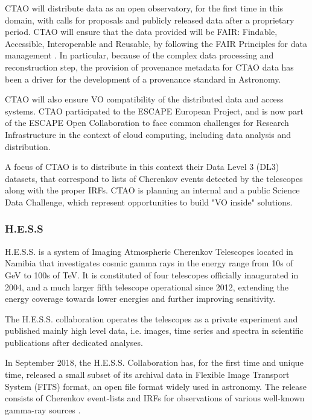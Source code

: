 \documentclass[11pt,a4paper]{ivoa}
\begin{document}
CTAO will distribute data as an open observatory, for the first time in this domain, with calls for proposals and publicly released data after a proprietary period. CTAO will ensure that the data provided will be FAIR: Findable, Accessible, Interoperable and Reusable, by following the FAIR Principles for data management \citep{Wilkinson2016}. In particular, because of the complex data processing and reconstruction step, the provision of provenance metadata for CTAO data has been a driver for the development of a provenance standard in Astronomy.

CTAO will also ensure VO compatibility of the distributed data and access systems. CTAO participated to the ESCAPE European Project, and is now part of the ESCAPE Open Collaboration to face common challenges for Research Infrastructure in the context of cloud computing, including data analysis and distribution.

A focus of CTAO is to distribute in this context their Data Level 3 (DL3) datasets, that correspond to lists of Cherenkov events detected by the telescopes along with the proper IRFs. CTAO is planning an internal and a public Science Data Challenge, which represent opportunities to build "VO inside" solutions.

\subsubsection{H.E.S.S}
\label{sec:hess}

H.E.S.S. is a system of Imaging Atmospheric Cherenkov Telescopes located in Namibia that investigates cosmic gamma rays in the energy range from 10s of GeV to 100s of TeV. It is constituted of four telescopes officially inaugurated in 2004, and a much larger fifth telescope operational since 2012, extending the energy coverage towards lower energies and further improving sensitivity.

The H.E.S.S. collaboration operates the telescopes as a private experiment and published mainly high level data, i.e. images, time series and spectra in scientific publications after dedicated analyses.

In September 2018, the H.E.S.S. Collaboration has, for the first time and unique time, released a small subset of its archival data in Flexible Image Transport System (FITS) format, an open file format widely used in astronomy. The release consists of Cherenkov event-lists and IRFs for observations of various well-known gamma-ray sources
\citep{hess-zenodo.1421098}.
\end{document}
